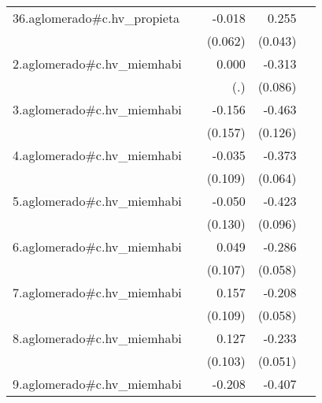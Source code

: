 {\begin{longtable}{l*{4}{D{.}{.}{-1}}}
\addlinespace
36.aglomerado#c.hv\_propieta&                     &      -0.018         &       0.255\sym{***}&                     \\
            &                     &     (0.062)         &     (0.043)         &                     \\
\addlinespace
2.aglomerado#c.hv\_miemhabi&                     &       0.000         &      -0.313\sym{***}&                     \\
            &                     &         (.)         &     (0.086)         &                     \\
\addlinespace
3.aglomerado#c.hv\_miemhabi&                     &      -0.156         &      -0.463\sym{***}&                     \\
            &                     &     (0.157)         &     (0.126)         &                     \\
\addlinespace
4.aglomerado#c.hv\_miemhabi&                     &      -0.035         &      -0.373\sym{***}&                     \\
            &                     &     (0.109)         &     (0.064)         &                     \\
\addlinespace
5.aglomerado#c.hv\_miemhabi&                     &      -0.050         &      -0.423\sym{***}&                     \\
            &                     &     (0.130)         &     (0.096)         &                     \\
\addlinespace
6.aglomerado#c.hv\_miemhabi&                     &       0.049         &      -0.286\sym{***}&                     \\
            &                     &     (0.107)         &     (0.058)         &                     \\
\addlinespace
7.aglomerado#c.hv\_miemhabi&                     &       0.157         &      -0.208\sym{***}&                     \\
            &                     &     (0.109)         &     (0.058)         &                     \\
\addlinespace
8.aglomerado#c.hv\_miemhabi&                     &       0.127         &      -0.233\sym{***}&                     \\
            &                     &     (0.103)         &     (0.051)         &                     \\
\addlinespace
9.aglomerado#c.hv\_miemhabi&                     &      -0.208         &      -0.407\sym{***}&                     \\

\end{longtable}}
